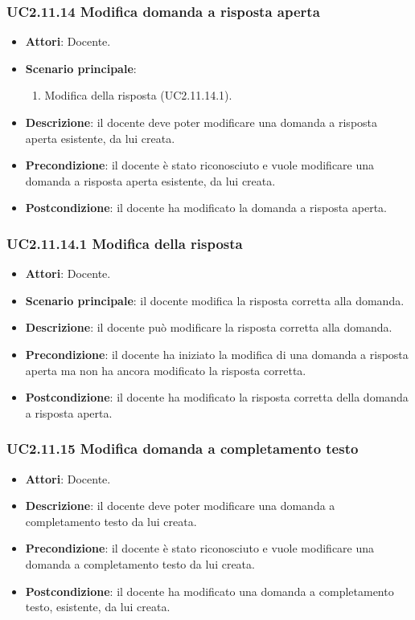 \subsubsection{UC2.11.14 Modifica domanda a risposta aperta}
\begin{itemize}
\item \textbf{Attori}: Docente.
\item \textbf{Scenario principale}:
\begin{enumerate}
\item Modifica della risposta (UC2.11.14.1).
\end{enumerate}
\item \textbf{Descrizione}: il docente deve poter modificare una domanda a risposta aperta esistente, da lui creata.
\item \textbf{Precondizione}: il docente è stato riconosciuto e vuole modificare una domanda a risposta aperta esistente, da lui creata.
\item \textbf{Postcondizione}: il docente ha modificato la domanda a risposta aperta.
\end{itemize}
\subsubsection{UC2.11.14.1 Modifica della risposta}
\begin{itemize}
\item \textbf{Attori}: Docente.
\item \textbf{Scenario principale}: il docente modifica la risposta corretta alla domanda.
\item \textbf{Descrizione}: il docente può modificare la risposta corretta alla domanda.
\item \textbf{Precondizione}: il docente ha iniziato la modifica di una domanda a risposta aperta ma non ha ancora modificato la risposta corretta.
\item \textbf{Postcondizione}: il docente ha modificato la risposta corretta della domanda a risposta aperta.
\end{itemize}
\subsubsection{UC2.11.15 Modifica domanda a completamento testo}
\begin{itemize}
\item \textbf{Attori}: Docente.
\item \textbf{Descrizione}: il docente deve poter modificare una domanda a completamento testo da lui creata.
\item \textbf{Precondizione}: il docente è stato riconosciuto e vuole modificare una domanda a completamento testo da lui creata.
\item \textbf{Postcondizione}: il docente ha modificato una domanda a completamento testo, esistente, da lui creata.
\end{itemize}
